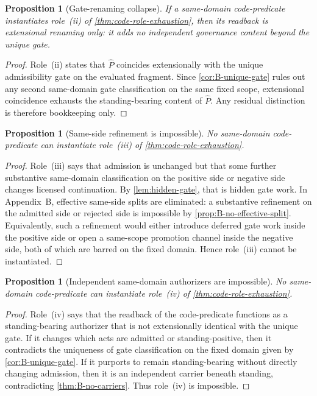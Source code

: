 \documentclass[11pt]{article}
\theoremstyle{plain}
\newtheorem{proposition}[theorem]{Proposition}
\theoremstyle{definition}
\begin{document}
\begin{proposition}[Gate-renaming collapse]
\label{prop:gate-renaming-collapse}
If a same-domain code-predicate instantiates role~\textup{(ii)} of \cref{thm:code-role-exhaustion}, then its readback is extensional renaming only: it adds no independent governance content beyond the unique gate.
\end{proposition}

\begin{proof}
Role~(ii) states that $\widehat P$ coincides extensionally with the unique admissibility gate on the evaluated fragment. Since \cref{cor:B-unique-gate} rules out any second same-domain gate classification on the same fixed scope, extensional coincidence exhausts the standing-bearing content of $\widehat P$. Any residual distinction is therefore bookkeeping only.
\end{proof}

\begin{proposition}[Same-side refinement is impossible]
\label{prop:same-side-refinement-impossible}
No same-domain code-predicate can instantiate role~\textup{(iii)} of \cref{thm:code-role-exhaustion}.
\end{proposition}

\begin{proof}
Role~(iii) says that admission is unchanged but that some further substantive same-domain classification on the positive side or negative side changes licensed continuation. By \cref{lem:hidden-gate}, that is hidden gate work. In Appendix~B, effective same-side splits are eliminated: a substantive refinement on the admitted side or rejected side is impossible by \cref{prop:B-no-effective-split}. Equivalently, such a refinement would either introduce deferred gate work inside the positive side or open a same-scope promotion channel inside the negative side, both of which are barred on the fixed domain. Hence role~(iii) cannot be instantiated.
\end{proof}

\begin{proposition}[Independent same-domain authorizers are impossible]
\label{prop:independent-authorizer-impossible}
No same-domain code-predicate can instantiate role~\textup{(iv)} of \cref{thm:code-role-exhaustion}.
\end{proposition}

\begin{proof}
Role~(iv) says that the readback of the code-predicate functions as a standing-bearing authorizer that is not extensionally identical with the unique gate. If it changes which acts are admitted or standing-positive, then it contradicts the uniqueness of gate classification on the fixed domain given by \cref{cor:B-unique-gate}. If it purports to remain standing-bearing without directly changing admission, then it is an independent carrier beneath standing, contradicting \cref{thm:B-no-carriers}. Thus role~(iv) is impossible.
\end{proof}
\end{document}
